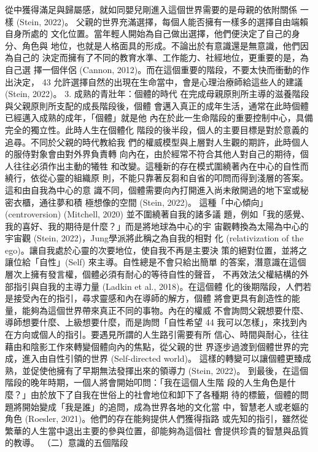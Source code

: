 從中獲得滿足與歸屬感，就如同嬰兒剛進入這個世界需要的是母親的依附關係
一樣 (Stein, 2022)。 
父親的世界充滿選擇，每個人能否擁有一樣多的選擇自由端賴自身所處的
文化位置。當年輕人開始為自己做出選擇，他們便決定了自己的身分、角色與
地位，也就是人格面具的形成。不論出於有意識還是無意識，他們因為自己的
決定而擁有了不同的教育水準、工作能力、社經地位，更重要的是，為自己選
擇一個伴侶 (Cannon, 2012)。而在這個重要的階段，不要太快而衝動的作出決定，
43 
允許選擇自然的出現在生命當中，會是心理治療師給這些人的建議 (Stein, 2022)。 
3. 成熟的青壯年：個體的時代 
在完成母親原則所主導的滋養階段與父親原則所支配的成長階段後，個體
會邁入真正的成年生活，通常在此時個體已經邁入成熟的成年，「個體」就是他
內在於此一生命階段的重要控制中心，具備完全的獨立性。此時人生在個體化
階段的後半段，個人的主要目標是對於意義的追尋。不同於父親的時代教給我
們的權威模型與上層對人生觀的期許，此時個人的服侍對象會由對外界負責轉
向內在，由於經常不符合其他人對自己的期待，個人往往必須作出主動的犧牲
和改變。這種新的存在模式圍繞著內在中心的自性而繞行，依從心靈的組織原
則，不能只靠著反芻和自省的叩問而得到淺層的答案。這和由自我為中心的意
識不同，個體需要向內打開進入尚未敞開過的地下室或秘密衣櫃，通往夢和積
極想像的空間 (Stein, 2022)。 
這種「中心傾向」 (centroversion) (Mitchell, 2020) 並不圍繞著自我的諸多議
題，例如「我的感覺、我的喜好、我的期待是什麼？」而是將地球為中心的宇
宙觀轉換為太陽為中心的宇宙觀 (Stein, 2022)，Jung學派將此稱之為自我的相對
化 (relativization of the ego)。讓自我處於心靈的次要地位，使自我不再是主要決
策的絕對位置，並將之讓位給「自性」(Self) 來主導。自性總是不會只給出簡單
的答案，潛意識在這個層次上擁有發言權，個體必須有耐心的等待自性的聲音，
不再效法父權結構的外部指引與自我的主導力量 (Ladkin et al., 2018)。在這個體
化的後期階段，人們若是接受內在的指引，尋求靈感和內在導師的解方，個體
將會更具有創造性的能量，能夠為這個世界帶來真正不同的事物。內在的權威
不會詢問父親想要什麼、導師想要什麼、上級想要什麼，而是詢問「自性希望
44 
我可以怎樣」，來找到內在方向或個人的指引。要遇見所謂的人生路引需要有所
信心、時間與耐心，往往藉由和陰影工作來轉變個體向內的焦點，從父親的世
界逐步過渡到個體世界的完成，進入由自性引領的世界 (Self-directed world)。
這樣的轉變可以讓個體更臻成熟，並促使他擁有了早期無法發揮出來的領導力 
(Stein, 2022)。 
到最後，在這個階段的晚年時期，一個人將會開始叩問：「我在這個人生階
段的人生角色是什麼？」由於放下了自我在世俗上的社會地位和卸下了各種期
待的標籤，個體的問題將開始變成「我是誰」的追問，成為世界各地的文化當
中，智慧老人或老嫗的角色 (Roesler, 2021)。他們的存在能夠提供人們獲得指路
或先知的指引，雖然從繁華的人生當中退出主要的參與位置，卻能夠為這個社
會提供珍貴的智慧與品質的教導。 
（二）意識的五個階段 
